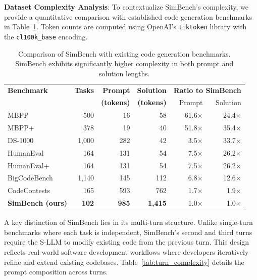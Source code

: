 
\medskip

{\noindent\textbf{Dataset Complexity Analysis}}: To contextualize SimBench's complexity, we provide a quantitative comparison with established code generation benchmarks in Table~\ref{tab:benchmark_comparison}. Token counts are computed using OpenAI's \texttt{tiktoken} library with the \texttt{cl100k\_base} encoding.

\begin{table}[h!]
    \centering
    \caption{Comparison of SimBench with existing code generation benchmarks. SimBench exhibits significantly higher complexity in both prompt and solution lengths.}
    \label{tab:benchmark_comparison}
    \begin{tabular}{l r r r r r}
        \toprule
        \textbf{Benchmark} & \textbf{Tasks} & \textbf{Prompt} & \textbf{Solution} & \multicolumn{2}{c}{\textbf{Ratio to SimBench}} \\
        & & \textbf{(tokens)} & \textbf{(tokens)} & Prompt & Solution \\
        \midrule
        MBPP~\cite{austin2021program} & 500 & 16 & 58 & 61.6$\times$ & 24.4$\times$ \\
        MBPP+~\cite{liu2024your} & 378 & 19 & 40 & 51.8$\times$ & 35.4$\times$ \\
        DS-1000~\cite{lai2023ds} & 1,000 & 282 & 42 & 3.5$\times$ & 33.7$\times$ \\
        HumanEval~\cite{chen2021evaluating} & 164 & 131 & 54 & 7.5$\times$ & 26.2$\times$ \\
        HumanEval+~\cite{liu2024your} & 164 & 131 & 54 & 7.5$\times$ & 26.2$\times$ \\
        BigCodeBench~\cite{zhuo2024bigcodebench} & 1,140 & 145 & 112 & 6.8$\times$ & 12.6$\times$ \\
        CodeContests~\cite{li2022competition} & 165 & 593 & 762 & 1.7$\times$ & 1.9$\times$ \\
        \midrule
        \textbf{SimBench (ours)} & \textbf{102} & \textbf{985} & \textbf{1,415} & 1.0$\times$ & 1.0$\times$ \\
        \bottomrule
    \end{tabular}
\end{table}

A key distinction of SimBench lies in its multi-turn structure. Unlike single-turn benchmarks where each task is independent, SimBench's second and third turns require the S-LLM to modify existing code from the previous turn. This design reflects real-world software development workflows where developers iteratively refine and extend existing codebases. Table~\ref{tab:turn_complexity} details the prompt composition across turns.

